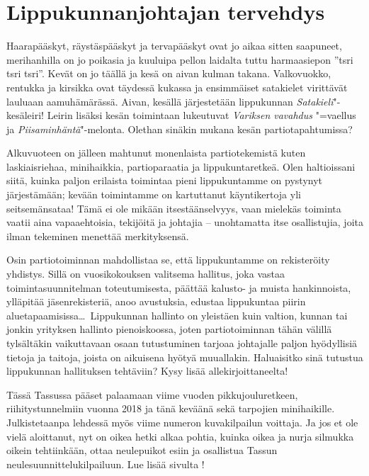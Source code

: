 \section{Lippukunnanjohtajan tervehdys}

\begin{multicols}{2}
\noindent Haarapääskyt, räystäspääskyt ja tervapääskyt ovat jo aikaa sitten saapuneet, merihanhilla on jo poikasia ja kuuluipa pellon laidalta tuttu harmaasiepon ''tsri tsri tsri''. Kevät on jo täällä ja kesä on aivan kulman takana. Valkovuokko, rentukka ja kirsikka ovat täydessä kukassa ja ensimmäiset satakielet virittävät lauluaan aamuhämärässä. Aivan, kesällä järjestetään lippukunnan \textit{Satakieli}"-kesäleiri! Leirin lisäksi kesän toimintaan lukeutuvat \textit{Variksen vavahdus} "=vaellus ja \textit{Piisaminhäntä}"-melonta. Olethan sinäkin mukana kesän partiotapahtumissa?

Alkuvuoteen on jälleen mahtunut monenlaista partiotekemistä kuten laskiaisriehaa, minihaikkia, partioparaatia ja lippukuntaretkeä. Olen haltioissani siitä, kuinka paljon erilaista toimintaa pieni lippukuntamme on pystynyt järjestämään; kevään toimintamme on kartuttanut käyntikertoja yli seitsemänsataa! Tämä ei ole mikään itsestäänselvyys, vaan mielekäs toiminta vaatii aina vapaaehtoisia, tekijöitä ja johtajia -- unohtamatta itse osallistujia, joita ilman tekeminen menettää merkityksensä.  

Osin partiotoiminnan mahdollistaa se, että lippukuntamme on rekisteröity yhdistys. Sillä on vuosikokouksen valitsema hallitus, joka vastaa toimintasuunnitelman toteutumisesta, päättää kalusto- ja muista hankinnoista, ylläpitää jäsenrekisteriä, anoo avustuksia, edustaa lippukuntaa piirin aluetapaamisissa\ldots\ Lippukunnan hallinto on yleistäen kuin valtion, kunnan tai jonkin yrityksen hallinto pienoiskoossa, joten partiotoiminnan tähän välillä tylsältäkin vaikuttavaan osaan tutustuminen tarjoaa johtajalle paljon hyödyllisiä tietoja ja taitoja, joista on aikuisena hyötyä muuallakin. Haluaisitko sinä tutustua lippukunnan hallituksen tehtäviin? Kysy lisää allekirjoittaneelta!

Tässä Tassussa pääset palaamaan viime vuoden pikkujouluretkeen, riihitystunnelmiin vuonna 2018 ja tänä keväänä sekä tarpojien minihaikille. Julkistetaanpa lehdessä myös viime numeron kuvakilpailun voittaja. Ja jos et ole vielä aloittanut, nyt on oikea hetki alkaa pohtia, kuinka oikea ja nurja silmukka oikein tehtiinkään, ottaa neulepuikot esiin ja osallistua Tassun neulesuunnittelukilpailuun. Lue lisää sivulta \pageref{sec:neulekilpailu}!


\end{multicols}
